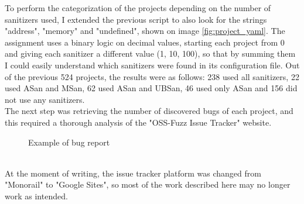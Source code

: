 \newpage
To perform the categorization of the projects depending on the number of sanitizers used, I extended the previous script to also look for the strings "address", "memory" and "undefined", shown on image \ref{fig:project_yaml}.
\newline
The assignment uses a binary logic on decimal values, starting each project from 0 and giving each sanitizer a different value (1, 10, 100), so that by summing them I could easily understand which sanitizers were found in its configuration file.
\newline \newline
Out of the previous 524 projects, the results were as follows: 238 used all sanitizers, 22 used ASan and MSan, 62 used ASan and UBSan, 46 used only ASan and 156 did not use any sanitizers.
\ \\ \newline \newline
The next step was retrieving the number of discovered bugs of each project, and this required a thorough analysis of the "OSS-Fuzz Issue Tracker" website. \cite{ossfuzz_bugtracker}
\newline
\begin{figure}[h]
\caption{Example of bug report \cite{ossfuzz_bugtracker}}
\label{fig:issue}
\end{figure}
\ \\
At the moment of writing, the issue tracker platform was changed from "Monorail" to "Google Sites", so most of the work described here may no longer work as intended.




